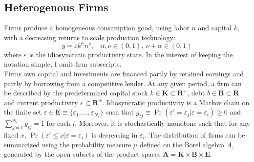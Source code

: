 \documentclass[12pt]{article}
\begin{document}
\subsection{Heterogenous Firms \label{sec:firms}}
Firms produce a homogeneous consumption good, using labor $n$ and capital $k$, with a decreasing returns to scale production technology:
\begin{equation} \label{eq:prodf}
y = \varepsilon k^{\alpha}n^{\nu}, \ \ \ \ \alpha,\nu \in (0,1),  \ \nu + \alpha \in (0,1)
\end{equation}  
where $\varepsilon$ is the idiosyncratic productivity state. In the interest of keeping the notation simple, I omit firm subscripts. \vspace{3mm} \\
Firms own capital and investments are financed partly by retained earnings and partly by borrowing from a competitive lender. At any given period, a firm can be described by the predetermined capital stock $k \in \mathbf{K} \subset \mathbf{R^{+}}$, debt $b \in \mathbf{B} \subset \mathbf{R}$ and current productivity $\varepsilon \subset \mathbf{R^+}$.  Idiosyncratic productivity is a Markov chain on the finite set $\varepsilon \in \mathbf{E} \equiv \{ \varepsilon_1,...,\varepsilon_{N_{\varepsilon}} \}$ such that $ g_{ij} \equiv \Pr(\varepsilon'= \varepsilon_j|\varepsilon = \varepsilon_i) \geq 0$ and $\sum_{j=1}^{N_{\varepsilon}} g_{ij} = 1$ for each $i$. Moreover, it is stochastically monotone such that for any fixed $x$, $\Pr(\varepsilon' \leq x | \varepsilon = \varepsilon_i)$ is decreasing in $\varepsilon_i$. The distribution of firms can be summarized using the probability measure $\mu$ defined on the Borel algebra $A$, generated by the open subsets of the product spaces $ \mathbf{A} = \mathbf{K} \times \mathbf{B} \times \mathbf{E} $.
\end{document}
